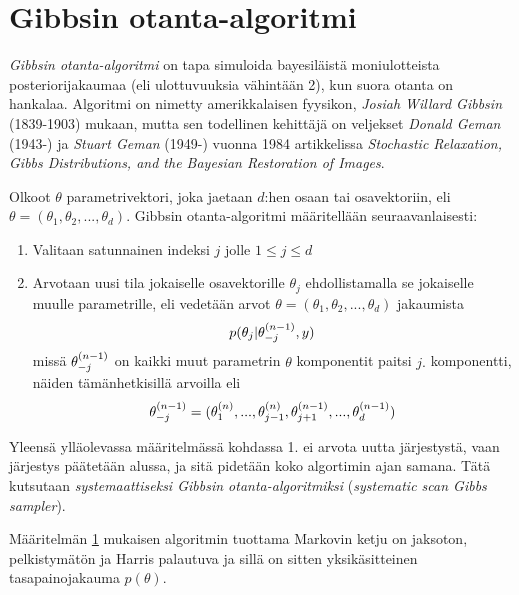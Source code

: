 \section{Gibbsin otanta-algoritmi}\label{gibbs}

\textit{Gibbsin otanta-algoritmi} on tapa simuloida bayesiläistä moniulotteista posteriorijakaumaa (eli ulottuvuuksia vähintään 2), kun suora otanta on hankalaa. Algoritmi on nimetty amerikkalaisen fyysikon, \textit{Josiah Willard Gibbsin} (1839-1903) mukaan, mutta sen todellinen kehittäjä on veljekset \textit{Donald Geman} (1943-) ja \textit{Stuart Geman} (1949-) vuonna 1984 artikkelissa \textit{Stochastic Relaxation, Gibbs Distributions, and the Bayesian Restoration of Images}.


\begin{maar}\label{gibbs}
	Olkoot $\theta$ parametrivektori, joka jaetaan $d$:hen osaan tai osavektoriin, eli $\theta = (\theta_1, \theta_2,...,\theta_d)$. Gibbsin otanta-algoritmi määritellään seuraavanlaisesti:
	\begin{enumerate}
		\item Valitaan satunnainen indeksi $j$ jolle $1 \leq j \leq d$
		\item Arvotaan uusi tila jokaiselle osavektorille $\theta_j$ ehdollistamalla se jokaiselle muulle parametrille, eli vedetään arvot $\theta = (\theta_1, \theta_2,...,\theta_d)$ jakaumista
		\begin{equation}
			p(\theta_j|\theta^{(n-1)}_{-j},y)
		\end{equation}
		missä $\theta^{(n-1)}_{-j}$ on kaikki muut parametrin $\theta$ komponentit paitsi $j.$ komponentti, näiden tämänhetkisillä arvoilla eli 
		\begin{equation*}
			\theta^{(n-1)}_{-j} = (\theta^{(n)}_{1},...,\theta^{(n)}_{j-1},\theta^{(n-1)}_{j+1},...,\theta^{(n-1)}_{d})
		\end{equation*}
	\end{enumerate}
\end{maar}

Yleensä ylläolevassa määritelmässä kohdassa 1. ei arvota uutta järjestystä, vaan järjestys päätetään alussa, ja sitä pidetään koko algortimin ajan samana. Tätä kutsutaan \emph{systemaattiseksi Gibbsin otanta-algoritmiksi} (\textit{systematic scan Gibbs sampler}).

\begin{lause}\label{gibbs-proof}
	Määritelmän \ref{gibbs} mukaisen algoritmin tuottama Markovin ketju on jaksoton, pelkistymätön ja Harris palautuva ja sillä on sitten yksikäsitteinen tasapainojakauma $p(\theta)$. \cite{koistinen_computational_2009}
\end{lause}

